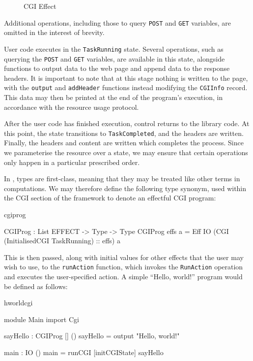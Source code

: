 \begin{figure*}[t]
\begin{center}
\end{center}
\caption{CGI Effect}
\label{fig:cgieffect}
\end{figure*}

Additional operations, including those to query \texttt{POST} and \texttt{GET}
variables, are omitted in the interest of brevity.

User code executes in the \texttt{TaskRunning} state. Several operations, such
as querying the \texttt{POST} and \texttt{GET} variables, are available in this state, alongside
functions to output data to the web page and append data to the response
headers. It is important to note that at this stage nothing is written to the
page, with the \texttt{output} and \texttt{addHeader} functions instead
modifying the \texttt{CGIInfo} record. This data may then be printed at the end of the
program's execution, in accordance with the resource usage protocol.

After the user code has finished execution, control returns to the library
code. At this point, the state transitions to \texttt{TaskCompleted}, 
and the headers
are written.  Finally, the headers and content are written which completes the
process. Since we parameterise the resource over a state, we may ensure that
certain operations only happen in a particular prescribed order.

In \idris{}, types are first-class, meaning that they may be treated like other
terms in computations. We may therefore define the following type synonym, used
within the CGI section of the framework to denote an effectful CGI program: 

\begin{SaveVerbatim}{cgiprog}

CGIProg : List EFFECT -> Type -> Type
CGIProg effs a = 
  Eff IO (CGI (InitialisedCGI TaskRunning) :: effs) a

\end{SaveVerbatim}

\noindent
This is then passed, along with initial values for other effects that the user
may wish to use, to the \texttt{runAction} function, which invokes the \texttt{RunAction}
operation and executes the user-specified action.
%
A simple ``Hello, world!'' program would be defined as follows:

\begin{SaveVerbatim}{hworldcgi}

module Main
import Cgi

sayHello : CGIProg [] ()
sayHello = output "Hello, world!"

main : IO ()
main = runCGI [initCGIState] sayHello

\end{SaveVerbatim}

